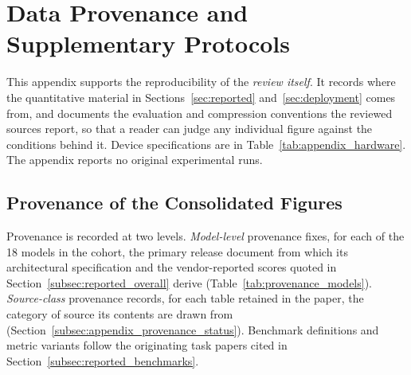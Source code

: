 \section{Data Provenance and Supplementary Protocols}
\label{appendix:supplementary}
\label{app:provenance}

This appendix supports the reproducibility of the \emph{review itself}. It records where the quantitative material in Sections~\ref{sec:reported} and~\ref{sec:deployment} comes from, and documents the evaluation and compression conventions the reviewed sources report, so that a reader can judge any individual figure against the conditions behind it. Device specifications are in Table~\ref{tab:appendix_hardware}. The appendix reports no original experimental runs.

\subsection{Provenance of the Consolidated Figures}
\label{subsec:appendix_provenance_table}


Provenance is recorded at two levels. \emph{Model-level} provenance fixes, for
each of the 18 models in the cohort, the primary release document from which its
architectural specification and the vendor-reported scores quoted in
Section~\ref{subsec:reported_overall} derive
(Table~\ref{tab:provenance_models}). \emph{Source-class} provenance records, for
each table retained in the paper, the category of source its contents are drawn
from (Section~\ref{subsec:appendix_provenance_status}). Benchmark definitions and
metric variants follow the originating task papers cited in
Section~\ref{subsec:reported_benchmarks}.

